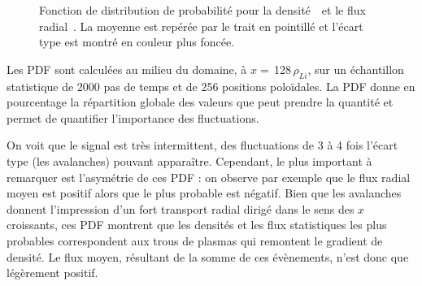 \begin{refsection}
\begin{figure}[!htbp]
    \centering
    \caption{Fonction de distribution de probabilité pour la
    densité~~et le flux
    radial~. La moyenne est repérée par le trait en
    pointillé et l'écart type est montré en couleur plus foncée.}
    \label{2-PDFBase}
\end{figure}

Les PDF
sont calculées au milieu du domaine, à $x=\,$128$\,\rho_{Li}$, sur un
échantillon statistique de 2000 pas de temps et de 256 positions
poloïdales. La PDF donne en pourcentage la répartition globale des valeurs
que peut prendre la quantité et permet de quantifier l'importance des fluctuations.

On voit que le signal est très
intermittent, des fluctuations de 3 à 4 fois l'écart type (les avalanches)
pouvant apparaître. Cependant, le plus important à remarquer est l'asymétrie de
ces PDF :
on observe par exemple que le flux radial moyen est positif alors que le plus
probable est négatif. Bien que
les avalanches donnent l'impression d'un fort transport radial dirigé
dans le sens des $x$ croissants, ces PDF montrent que les densités et les flux
statistiques les plus probables correspondent aux trous de plasmas qui
remontent le gradient de densité. Le flux moyen, résultant de la somme de
ces évènements, n'est donc que légèrement positif.


\end{refsection}
